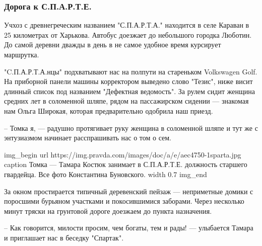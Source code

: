  
 
 

\subsubsection{Дорога к С.П.А.Р.Т.Е.}
\label{sec:25_10_2019.news.pravda_com_ua.SPARTA.doroga_k_SPARTE}

Учхоз с древнегреческим названием "С.П.А.Р.Т.А." находится в селе Караван в 25
километрах от Харькова. Автобус доезжает до небольшого городка Люботин. До
самой деревни дважды в день в не самое удобное время курсирует маршрутка.

"C.П.А.Р.Т.А.нцы" подхватывают нас на полпути на стареньком Volkswagen Golf. На
приборной панели машины корректором выведено слово "Тезис", ниже висит длинный
список под названием "Дефектная ведомость". За рулем сидит женщина средних лет
в соломенной шляпе, рядом на пассажирском сидении --- знакомая нам Ольга Широкая,
которая предварительно одобрила наш приезд.

– Томка я, --- радушно протягивает руку женщина в соломенной шляпе и тут же с
энтузиазмом начинает расспрашивать нас о том о сем.

\ifcmt
img_begin 
	url https://img.pravda.com/images/doc/a/e/aec4750-1sparta.jpg
	caption Томка --- Тамара Костюк занимает в С.П.А.Р.Т.Е. должность старшего гвардейца.
Все фото Константина Буновского.
	width 0.7
img_end
\fi
  
За окном простирается типичный деревенский пейзаж --- неприметные домики с
поросшими бурьяном участками и покосившимися заборами. Через несколько минут
тряски на грунтовой дороге доезжаем до пункта назначения.

– Как говорится, милости просим, чем богаты, тем и рады! --- улыбается Тамара и
приглашает нас в беседку "Спартак".

